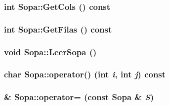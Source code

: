 \hypertarget{class_sopa_614d4b57feb5bf092e86471270f3be4d}{
\subsubsection[{GetCols}]{\setlength{\rightskip}{0pt plus 5cm}int Sopa::GetCols () const}}
\label{class_sopa_614d4b57feb5bf092e86471270f3be4d}


\hypertarget{class_sopa_97a63c30e5c03a6870e1459cf0a760be}{
\subsubsection[{GetFilas}]{\setlength{\rightskip}{0pt plus 5cm}int Sopa::GetFilas () const}}
\label{class_sopa_97a63c30e5c03a6870e1459cf0a760be}


\hypertarget{class_sopa_d313e5e948a60d99f232024842cae8ef}{
\subsubsection[{LeerSopa}]{\setlength{\rightskip}{0pt plus 5cm}void Sopa::LeerSopa ()}}
\label{class_sopa_d313e5e948a60d99f232024842cae8ef}


\hypertarget{class_sopa_c58e6733cdd53d94097731f467cc183a}{
\subsubsection[{operator()}]{\setlength{\rightskip}{0pt plus 5cm}char Sopa::operator() (int {\em i}, \/  int {\em j}) const}}
\label{class_sopa_c58e6733cdd53d94097731f467cc183a}


\hypertarget{class_sopa_3f472f3e6179df645c12ba3f7c883cb8}{
\subsubsection[{operator=}]{ \& Sopa::operator= (const {\bf Sopa} \& {\em S})}}
\label{class_sopa_3f472f3e6179df645c12ba3f7c883cb8}


